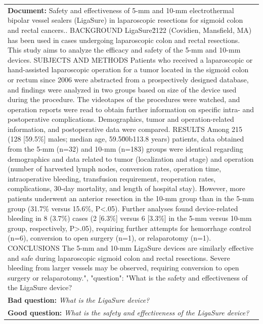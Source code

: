 \documentclass[11pt]{article}
\begin{document}
\begin{table}[htbp!]
\begin{small}
\begin{tabularx}{\textwidth}{X}
\textbf{\textcolor{blu}{Document:}} {\footnotesize Safety and effectiveness of 5-mm and 10-mm electrothermal bipolar vessel sealers (LigaSure) in laparoscopic resections for sigmoid colon and rectal cancers.. BACKGROUND LigaSure\u2122 (Covidien, Mansfield, MA) has been used in cases undergoing laparoscopic colon and rectal resections. This study aims to analyze the efficacy and safety of the 5-mm and 10-mm devices. SUBJECTS AND METHODS Patients who received a laparoscopic or hand-assisted laparoscopic operation for a tumor located in the sigmoid colon or rectum since 2006 were abstracted from a prospectively designed database, and findings were analyzed in two groups based on size of the device used during the procedure. The videotapes of the procedures were watched, and operation reports were read to obtain further information on specific intra- and postoperative complications. Demographics, tumor and operation-related information, and postoperative data were compared. RESULTS Among 215 (128 [59.5\%] males; median age, 59.5\u00b113.8 years) patients, data obtained from the 5-mm (n=32) and 10-mm (n=183) groups were identical regarding demographics and data related to tumor (localization and stage) and operation (number of harvested lymph nodes, conversion rates, operation time, intraoperative bleeding, transfusion requirement, reoperation rates, complications, 30-day mortality, and length of hospital stay). However, more patients underwent an anterior resection in the 10-mm group than in the 5-mm group (31.7\% versus 15.6\%, P<.05). Further analyses found device-related bleeding in 8 (3.7\%) cases (2 [6.3\%] versus 6 [3.3\%] in the 5-mm versus 10-mm group, respectively, P>.05), requiring further attempts for hemorrhage control (n=6), conversion to open surgery (n=1), or relaparotomy (n=1). CONCLUSIONS The 5-mm and 10-mm LigaSure devices are similarly effective and safe during laparoscopic sigmoid colon and rectal resections. Severe bleeding from larger vessels may be observed, requiring conversion to open surgery or relaparotomy.", "question": "What is the safety and effectiveness of the LigaSure device?} \\
\textbf{\textcolor{orng}{Bad question:}} \textit{What is the LigaSure device?}  \\ 
\textbf{\textcolor{rd}{Good question:}}  \textit{What is the safety and effectiveness of the LigaSure device?}  \\
\bottomrule
\end{tabularx}
 \end{small}
\end{table}
\end{document}
